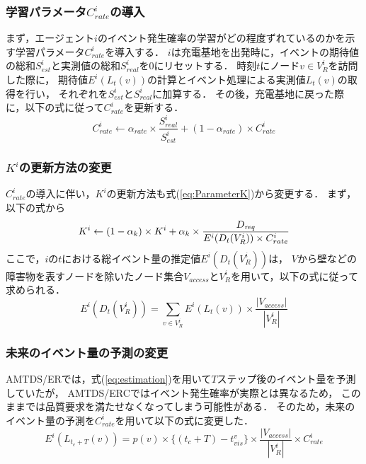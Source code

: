 \documentclass[12pt,a4j,twoside]{jarticle}
\def\Dreq{{D_{\it req}}}
\begin{document}
  \subsubsection{学習パラメータ$C^i_{rate}$の導入}
  まず，エージェント$i$のイベント発生確率の学習がどの程度ずれているのかを示す学習パラメータ$C^i_{rate}$を導入する．
  $i$は充電基地を出発時に，イベントの期待値の総和$S^i_{est}$と実測値の総和$S^i_{real}$を0にリセットする．
  時刻$t$にノード$v \in V^i_R$を訪問した際に，
  期待値$E^i(L_t(v))$の計算とイベント処理による実測値$L_t(v)$の取得を行い，
  それぞれを$S^i_{est}$と$S^i_{real}$に加算する．
  その後，充電基地に戻った際に，以下の式に従って$C^i_{rate}$を更新する．
    \begin{equation}
      C^i_{rate} \gets \alpha_{rate} \times \dfrac{S^i_{real}}{S^i_{est}} + (1-\alpha_{rate}) \times C^i_{rate}
    \end{equation}
  
  \subsubsection{$K^i$の更新方法の変更}
  $C^i_{rate}$の導入に伴い，$K^i$の更新方法も式(\ref{eq:ParameterK})から変更する．
  まず，以下の式から
  \begin{equation}\label{eq:ParameterK/ERC}
    K^i \gets (1 - \alpha_k) \times K^i + \alpha_k \times \dfrac{\Dreq}{E^i(D_t(V^i_R)) \times C^i_{rate}}
  \end{equation}
  ここで，$i$の$t$における総イベント量の推定値$E^i(D_t(V^i_R))$は，
  $V$から壁などの障害物を表すノードを除いたノード集合$V_{access}$と$V^i_R$を用いて，以下の式に従って求められる．
    \begin{equation}
      E^i(D_t(V^i_R))=\sum_{v\in V^i_R} E^i(L_t(v)) \times \dfrac{|V_{access}|}{|V^i_R|}   
    \end{equation}

  \subsubsection{未来のイベント量の予測の変更}
  AMTDS/ERでは，式(\ref{eq:estimation})を用いて$T$ステップ後のイベント量を予測していたが，
  AMTDS/ERCではイベント発生確率が実際とは異なるため，
  このままでは品質要求を満たせなくなってしまう可能性がある．
  そのため，未来のイベント量の予測を$C^i_{rate}$を用いて以下の式に変更した．
  \begin{equation}
    E^i(L_{t_c+T}(v)) = p(v) \times \{(t_c+T)-t^v_{vis}\} \times \dfrac{|V_{access}|}{|V^i_R|} \times C^i_{rate}
  \end{equation}
  
\end{document}
